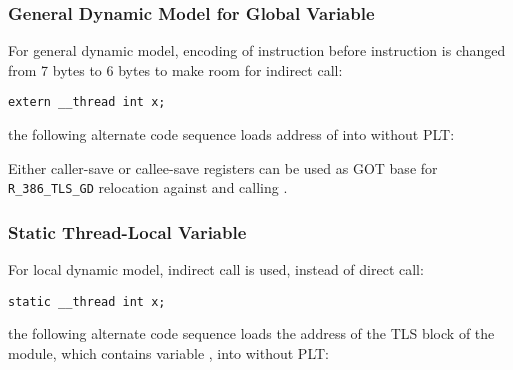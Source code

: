 \subsubsection{General Dynamic Model for Global Variable}

For general dynamic model, encoding of  instruction before
 instruction is changed from 7 bytes to 6 bytes to make
room for indirect call:

\begin{verbatim}
extern __thread int x;
\end{verbatim}

\noindent
the following alternate code sequence loads address of  into
 without PLT:

\begin{table}[H]
\Hrule
\caption{General Dynamic Model Code Sequence}
\begin{center}
\myfontsize{}
\end{center}
\Hrule
\end{table}

\noindent
Either caller-save or callee-save registers can be used as GOT base
for \texttt{R_386_TLS_GD} relocation against  and calling
.

\subsubsection{Static Thread-Local Variable}

For local dynamic model, indirect call is used, instead of direct call:

\begin{verbatim}
static __thread int x;
\end{verbatim}

\noindent
the following alternate code sequence loads the address of the
TLS block of the module, which contains variable , into
 without PLT:

\begin{table}[H]
\Hrule
\caption{Local Dynamic Model Code Sequence}
\begin{center}
\myfontsize{}
\end{center}
\Hrule
\end{table}

